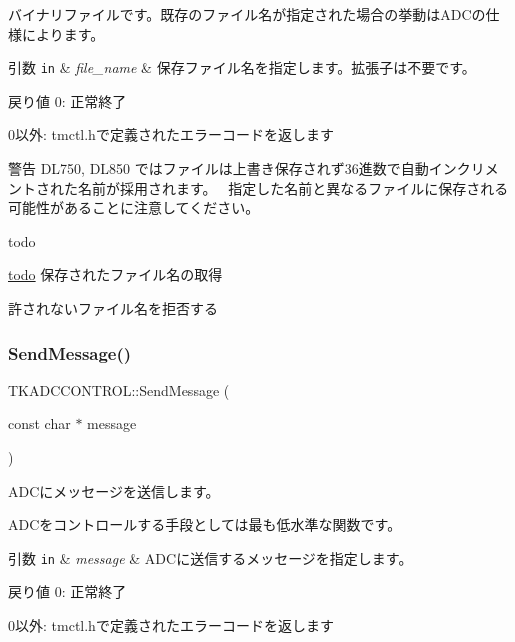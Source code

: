 バイナリファイルです。既存のファイル名が指定された場合の挙動は\+A\+D\+Cの仕様によります。 
\begin{DoxyParams}[1]{引数}
\mbox{\tt in}  & {\em file\+\_\+name} & 保存ファイル名を指定します。拡張子は不要です。 \\
\hline
\end{DoxyParams}
\begin{DoxyReturn}{戻り値}
0\+: 正常終了 

0以外\+: tmctl.\+hで定義されたエラーコードを返します 
\end{DoxyReturn}
\begin{DoxyWarning}{警告}
D\+L750, D\+L850 ではファイルは上書き保存されず36進数で自動インクリメントされた名前が採用されます。~\newline
 指定した名前と異なるファイルに保存される可能性があることに注意してください。 
\end{DoxyWarning}
\begin{DoxyRefDesc}{todo}
\item[\hyperlink{todo__todo000001}{todo}]保存されたファイル名の取得 

許されないファイル名を拒否する \end{DoxyRefDesc}
\mbox{\label{class_t_k_a_d_c_c_o_n_t_r_o_l_a2808f2efde28bcfc670d0ddfe2c6791e}} 
\subsubsection{\texorpdfstring{Send\+Message()}{SendMessage()}}
{\footnotesize\ttfamily T\+K\+A\+D\+C\+C\+O\+N\+T\+R\+O\+L\+::\+Send\+Message (\begin{DoxyParamCaption}\item[{const char $\ast$}]{message }\end{DoxyParamCaption})}

A\+D\+Cにメッセージを送信します。

A\+D\+Cをコントロールする手段としては最も低水準な関数です。 
\begin{DoxyParams}[1]{引数}
\mbox{\tt in}  & {\em message} & A\+D\+Cに送信するメッセージを指定します。 \\
\hline
\end{DoxyParams}
\begin{DoxyReturn}{戻り値}
0\+: 正常終了 

0以外\+: tmctl.\+hで定義されたエラーコードを返します 
\end{DoxyReturn}
\mbox{\label{class_t_k_a_d_c_c_o_n_t_r_o_l_afd243c443ca134193acc8a409368aaf3}} 
